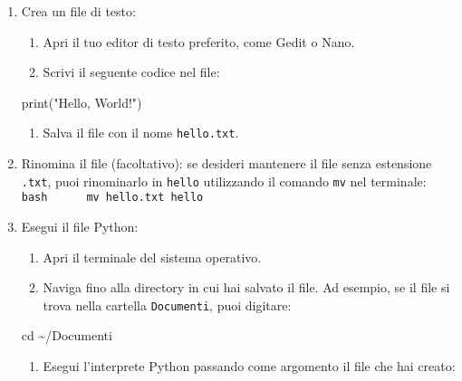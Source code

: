 \documentclass[
  letterpaper,
  DIV=11,
  numbers=noendperiod]{scrreprt}
\newenvironment{Shaded}{\begin{snugshade}}{\end{snugshade}}
\newcommand{\BuiltInTok}[1]{\textcolor[rgb]{0.00,0.23,0.31}{#1}}
\newcommand{\NormalTok}[1]{\textcolor[rgb]{0.00,0.23,0.31}{#1}}
\newcommand{\StringTok}[1]{\textcolor[rgb]{0.13,0.47,0.30}{#1}}
\providecommand{\tightlist}{%
  \setlength{\itemsep}{0pt}\setlength{\parskip}{0pt}}\usepackage{longtable,booktabs,array}
\begin{document}
\begin{enumerate}
\def\labelenumi{\arabic{enumi}.}
\item
  Crea un file di testo:

  \begin{enumerate}
  \def\labelenumii{\arabic{enumii}.}
  \tightlist
  \item
    Apri il tuo editor di testo preferito, come Gedit o Nano.
  \item
    Scrivi il seguente codice nel file:
  \end{enumerate}

\begin{Shaded}
\begin{Highlighting}[]
\BuiltInTok{print}\NormalTok{(}\StringTok{"Hello, World!"}\NormalTok{)}
\end{Highlighting}
\end{Shaded}

  \begin{enumerate}
  \def\labelenumii{\arabic{enumii}.}
  \setcounter{enumii}{2}
  \tightlist
  \item
    Salva il file con il nome \texttt{hello.txt}.
  \end{enumerate}
\item
  Rinomina il file (facoltativo): se desideri mantenere il file senza
  estensione \texttt{.txt}, puoi rinominarlo in \texttt{hello}
  utilizzando il comando \texttt{mv} nel terminale:
  \texttt{bash\ \ \ \ \ \ mv\ hello.txt\ hello}
\item
  Esegui il file Python:

  \begin{enumerate}
  \def\labelenumii{\arabic{enumii}.}
  \tightlist
  \item
    Apri il terminale del sistema operativo.
  \item
    Naviga fino alla directory in cui hai salvato il file. Ad esempio,
    se il file si trova nella cartella \texttt{Documenti}, puoi
    digitare:
  \end{enumerate}

\begin{Shaded}
\begin{Highlighting}[]
\BuiltInTok{cd}\NormalTok{ \textasciitilde{}/Documenti}
\end{Highlighting}
\end{Shaded}

  \begin{enumerate}
  \def\labelenumii{\arabic{enumii}.}
  \setcounter{enumii}{2}
  \tightlist
  \item
    Esegui l'interprete Python passando come argomento il file che hai
    creato:
  \end{enumerate}


\end{enumerate}
\end{document}
